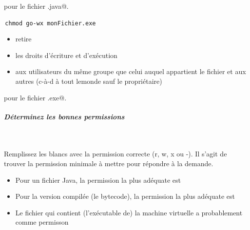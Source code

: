 \documentclass[11pt,a4paper]{article}
\begin{document}
          pour le fichier \verb@monFichier.java@.
        
            \par
        \,\verb|chmod go-wx monFichier.exe|\,
					\begin{itemize}
				
			\item retire
			\item les droits d'\'ecriture et d'ex\'ecution
			\item aux utilisateurs du m\^eme groupe que celui auquel appartient le fichier et aux autres (c-\`a-d \`a tout lemonde sauf le propri\'etaire)
					\end{itemize}
				
          pour le fichier \verb@monFichier.exe@.
        
            \par
        
			
		\subparagraph{D\'eterminez les bonnes permissions} 
		
                \textcolor{white}{.} \par
              
							Remplissez les blancs avec la permission correcte (r, w, x ou -). 
							Il s'agit de trouver la permission minimale \`a mettre pour r\'epondre \`a la demande.   
						
					\begin{itemize}
				
			\item 
									Pour un fichier Java, la permission la plus ad\'equate est
									 \textcolor{gray}{\underline{\hspace*{1em}}}  \textcolor{gray}{\underline{\hspace*{1em}}}  \textcolor{gray}{\underline{\hspace*{1em}}} 
			\item 
									Pour la version compil\'ee (le bytecode), la permission la plus ad\'equate est
									 \textcolor{gray}{\underline{\hspace*{1em}}}  \textcolor{gray}{\underline{\hspace*{1em}}}  \textcolor{gray}{\underline{\hspace*{1em}}} 
			\item 
									Le fichier qui contient (l'ex\'ecutable de) la machine virtuelle a probablement comme permisson
									 \textcolor{gray}{\underline{\hspace*{1em}}}  \textcolor{gray}{\underline{\hspace*{1em}}}  \textcolor{gray}{\underline{\hspace*{1em}}} 
					\end{itemize}
				
\end{document}
